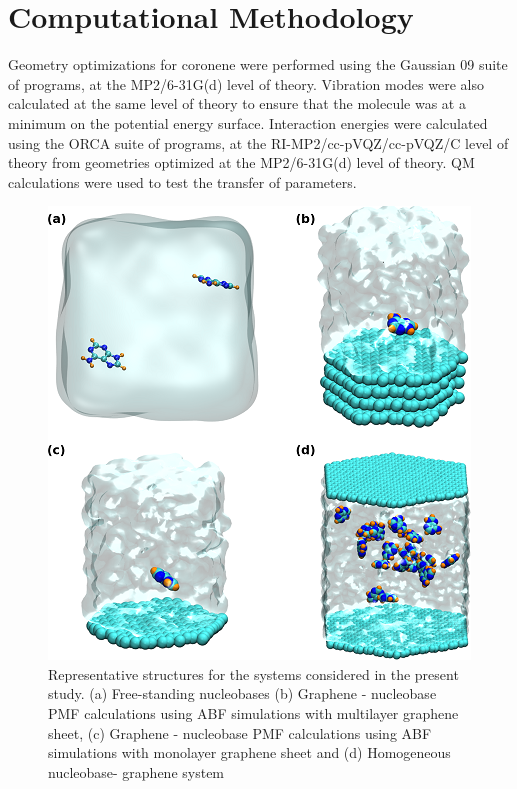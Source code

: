 \section{Computational Methodology}
Geometry optimizations for coronene were performed using the Gaussian 09 suite of programs, at the MP2/6-31G(d) level of theory. Vibration modes were also calculated at the same level of theory to ensure that the molecule was at a minimum on the potential energy surface.  Interaction energies were calculated using the ORCA suite of programs,\supercite{neese_orca_2012} at the RI-MP2/cc-pVQZ/cc-pVQZ/C level of theory from geometries optimized at the MP2/6-31G(d) level of theory. QM calculations were used to test the transfer of parameters.
\begin{figure}
    \centering
    \includegraphics{Chapter1/Figures/Figure1.png}
    \caption[Representative structures for the systems considered in the present study]{Representative structures for the systems considered in the present study. (a) Free-standing nucleobases (b) Graphene - nucleobase PMF calculations using ABF simulations with multilayer graphene sheet, (c) Graphene -  nucleobase PMF calculations using ABF simulations with monolayer graphene sheet and (d) Homogeneous nucleobase- graphene system}
    \label{fig:figure17}
\end{figure}

